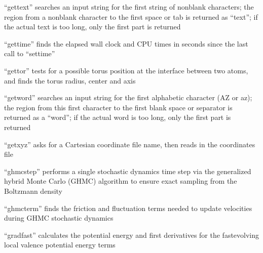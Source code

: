 \documentclass[letterpaper,11pt,english]{sphinxmanual}
\begin{document}
\sphinxAtStartPar
{}

\sphinxAtStartPar
“gettext” searches an input string for the first string of non\sphinxhyphen{}blank characters; the region from a non\sphinxhyphen{}blank character to the first space or tab is returned as “text”; if the actual text is too long, only the first part is returned

\sphinxAtStartPar
{}

\sphinxAtStartPar
“gettime” finds the elapsed wall clock and CPU times in seconds since the last call to “settime”

\sphinxAtStartPar
{}

\sphinxAtStartPar
“gettor” tests for a possible torus position at the interface between two atoms, and finds the torus radius, center and axis

\sphinxAtStartPar
{}

\sphinxAtStartPar
“getword” searches an input string for the first alphabetic character (A\sphinxhyphen{}Z or a\sphinxhyphen{}z); the region from this first character to the first blank space or separator is returned as a “word”; if the actual word is too long, only the first part is returned

\sphinxAtStartPar
{}

\sphinxAtStartPar
“getxyz” asks for a Cartesian coordinate file name, then reads in the coordinates file

\sphinxAtStartPar
{}

\sphinxAtStartPar
“ghmcstep” performs a single stochastic dynamics time step via the generalized hybrid Monte Carlo (GHMC) algorithm to ensure exact sampling from the Boltzmann density

\sphinxAtStartPar
{}

\sphinxAtStartPar
“ghmcterm” finds the friction and fluctuation terms needed to update velocities during GHMC stochastic dynamics

\sphinxAtStartPar
{}

\sphinxAtStartPar
“gradfast” calculates the potential energy and first derivatives for the fast\sphinxhyphen{}evolving local valence potential energy terms

\sphinxAtStartPar
{}
\end{document}
